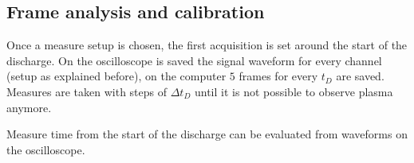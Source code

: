 \subsection{Frame analysis and calibration}
Once a measure setup is chosen, the first acquisition is set around the start of the discharge. On the oscilloscope is saved the signal waveform for every channel (setup as explained before), on the computer $5$ frames for every $t_D$ are saved. Measures are taken with steps of $\Delta t_D$ until it is not possible to observe plasma anymore.

Measure time from the start of the discharge can be evaluated from waveforms on the oscilloscope.

